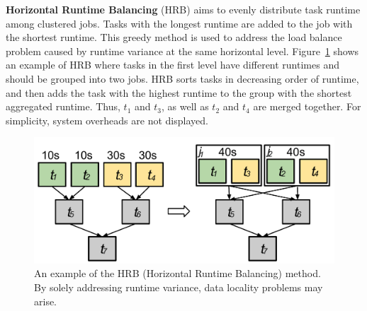 
\textbf{Horizontal Runtime Balancing} (HRB) aims to evenly distribute task runtime among clustered jobs. Tasks with the longest runtime are added to the job with the shortest runtime. This greedy method is used to address the load balance problem caused by runtime variance at the same horizontal level. Figure~\ref{fig:imbalance_hrb} shows an example of HRB where tasks in the first level have different runtimes and should be grouped into two jobs. HRB sorts tasks in decreasing order of runtime, and then adds the task with the highest runtime to the group with the shortest aggregated runtime. Thus, $t_1$ and $t_3$, as well as $t_2$ and $t_4$ are merged together.
For simplicity, system overheads are not displayed.

\begin{figure}[htb]
	\centering
	\includegraphics[width=0.85\linewidth]{figures/imbalance/hrb.pdf}
	\caption{An example of the HRB (Horizontal Runtime Balancing) method. By solely addressing runtime variance, data locality problems may arise.}
	\label{fig:imbalance_hrb}
\end{figure}

